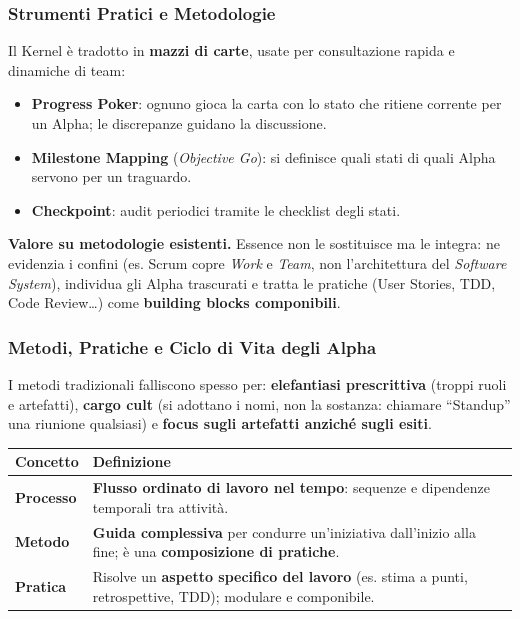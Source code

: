 \documentclass[12pt]{extarticle}
\begin{document}
\subsubsection{Strumenti Pratici e Metodologie}
\noindent Il Kernel è tradotto in \textbf{mazzi di carte}, usate per consultazione rapida e dinamiche di team:
\begin{itemize}
    \item \textbf{Progress Poker}: ognuno gioca la carta con lo stato che ritiene corrente per un Alpha; le discrepanze guidano la discussione.
    \item \textbf{Milestone Mapping} (\textit{Objective Go}): si definisce quali stati di quali Alpha servono per un traguardo.
    \item \textbf{Checkpoint}: audit periodici tramite le checklist degli stati.
\end{itemize}

\noindent \textbf{Valore su metodologie esistenti.} Essence non le sostituisce ma le integra: ne evidenzia i confini (es. Scrum copre \textit{Work} e \textit{Team}, non l'architettura del \textit{Software System}), individua gli Alpha trascurati e tratta le pratiche (User Stories, TDD, Code Review\ldots) come \textbf{building blocks componibili}.

\subsubsection{Metodi, Pratiche e Ciclo di Vita degli Alpha}
\noindent I metodi tradizionali falliscono spesso per: \textbf{elefantiasi prescrittiva} (troppi ruoli e artefatti), \textbf{cargo cult} (si adottano i nomi, non la sostanza: chiamare ``Standup'' una riunione qualsiasi) e \textbf{focus sugli artefatti anziché sugli esiti}.

\begin{center}
\small
\begin{tabular}{p{3.2cm}p{11.5cm}}
    \toprule
    \textbf{Concetto} & \textbf{Definizione} \\
    \midrule
    \textbf{Processo} & \textbf{Flusso ordinato di lavoro nel tempo}: sequenze e dipendenze temporali tra attività. \\
    \addlinespace
    \textbf{Metodo} & \textbf{Guida complessiva} per condurre un'iniziativa dall'inizio alla fine; è una \textbf{composizione di pratiche}. \\
    \addlinespace
    \textbf{Pratica} & Risolve un \textbf{aspetto specifico del lavoro} (es. stima a punti, retrospettive, TDD); modulare e componibile. \\
    \bottomrule
\end{tabular}
\end{center}
\end{document}
